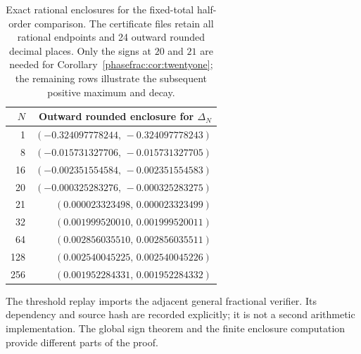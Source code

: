 \begin{table}[tbp]
\centering\small
\begin{tabular}{@{}rr@{}}
\toprule
$N$ & Outward rounded enclosure for $\Delta_N$\\
\midrule
1 & $(-0.324097778244,\,-0.324097778243)$\\
8 & $(-0.015731327706,\,-0.015731327705)$\\
16 & $(-0.002351554584,\,-0.002351554583)$\\
20 & $(-0.000325283276,\,-0.000325283275)$\\
21 & $(0.000023323498,\,0.000023323499)$\\
32 & $(0.001999520010,\,0.001999520011)$\\
64 & $(0.002856035510,\,0.002856035511)$\\
128 & $(0.002540045225,\,0.002540045226)$\\
256 & $(0.001952284331,\,0.001952284332)$\\
\bottomrule
\end{tabular}
\caption{Exact rational enclosures for the fixed-total half-order
comparison. The certificate files retain all rational endpoints and
24 outward rounded decimal places. Only the signs at $20$ and $21$
are needed for Corollary~\ref{phasefrac:cor:twentyone}; the remaining
rows illustrate the subsequent positive maximum and decay.}
\label{phasefrac:tab:reversal}
\end{table}

The threshold replay imports the adjacent general fractional verifier.
Its dependency and source hash are recorded explicitly; it is not a
second arithmetic implementation. The global sign theorem and the
finite enclosure computation provide different parts of the proof.

